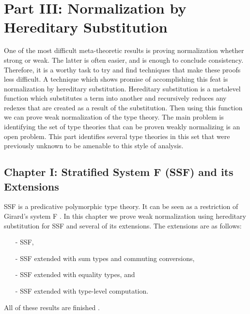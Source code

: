\section{Part III: Normalization by Hereditary Substitution}
\label{sec:normalization_by_hereditary_substitution}
One of the most difficult meta-theoretic results is proving
normalization whether strong or weak.  The latter is often easier, and
is enough to conclude consistency.  Therefore, it is a worthy task to
try and find techniques that make these proofs less difficult.  A
technique which shows promise of accomplishing this feat is
normalization by hereditary substitution.  Hereditary substitution is
a metalevel function which substitutes a term into another and
recursively reduces any redexes that are created as a result of the
substitution.  Then using this function we can prove weak
normalization of the type theory.  The main problem is identifying the
set of type theories that can be proven weakly normalizing is an open
problem.  This part identifies several type theories in this set that
were previously unknown to be amenable to this style of analysis. 

\subsection{Chapter I: Stratified System F (SSF) and its Extensions}
\label{subsec:stratified_system_f_ext}
SSF is a predicative polymorphic type theory.  It can be seen as a
restriction of Girard's system F \cite{Leivant:1991}. In this chapter
we prove weak normalization using hereditary substitution for SSF and
several of its extensions. The extensions are as follows:
\begin{itemize}
\item[-] SSF,
\item[-] SSF extended with sum types and commuting conversions,
\item[-] SSF extended with equality types, and
\item[-] SSF extended with type-level computation.
\end{itemize}
\noindent
All of these results are finished \cite{Eades:2011,Eades:2010}.


